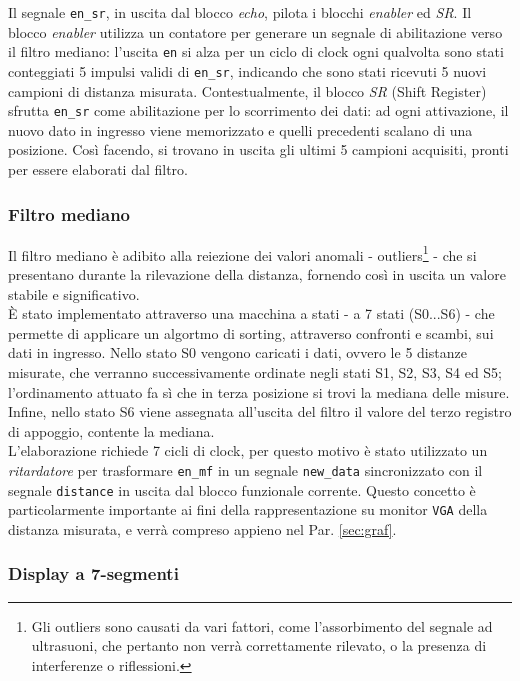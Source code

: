 \documentclass[reprint,amsmath,amssymb,aps,rmp,twoside]{revtex4-2}
\begin{document}
Il segnale \texttt{en\_sr}, in uscita dal blocco \textit{echo}, pilota i blocchi \textit{enabler} ed \textit{SR}. Il blocco \textit{enabler} utilizza un contatore per generare un segnale di abilitazione verso il filtro mediano: l'uscita \texttt{en} si alza per un ciclo di clock ogni qualvolta sono stati conteggiati 5 impulsi validi di \texttt{en\_sr}, indicando che sono stati ricevuti 5 nuovi campioni di distanza misurata. Contestualmente, il blocco \textit{SR} (Shift Register) sfrutta \texttt{en\_sr} come abilitazione per lo scorrimento dei dati: ad ogni attivazione, il nuovo dato in ingresso viene memorizzato e quelli precedenti scalano di una posizione. Così facendo, si trovano in uscita gli ultimi 5 campioni acquisiti, pronti per essere elaborati dal filtro.

\subsubsection{Filtro mediano}

Il filtro mediano è adibito alla reiezione dei valori anomali - outliers\footnote{Gli outliers sono causati da vari fattori, come l'assorbimento del segnale ad ultrasuoni, che pertanto non verrà correttamente rilevato, o la presenza di interferenze o riflessioni.} - che si presentano durante la rilevazione della distanza, fornendo così in uscita un valore stabile e significativo.\\ 
\`E stato implementato attraverso una macchina a stati - a 7 stati (S0...S6) - che permette di applicare un algortmo di sorting, attraverso confronti e scambi, sui dati in ingresso. Nello stato S0 vengono caricati i dati, ovvero le 5 distanze misurate, che verranno successivamente ordinate negli stati S1, S2, S3, S4 ed S5; l'ordinamento attuato fa sì che in terza posizione si trovi la mediana delle misure. Infine, nello stato S6 viene assegnata all'uscita del filtro  il valore del terzo registro di appoggio, contente la mediana.\\
L'elaborazione richiede 7 cicli di clock, per questo motivo è stato utilizzato un \textit{ritardatore} per trasformare \texttt{en\_mf} in un segnale \texttt{new\_data} sincronizzato con il segnale \texttt{distance} in uscita dal blocco funzionale corrente. Questo concetto è particolarmente importante ai fini della rappresentazione su monitor \texttt{VGA} della distanza misurata, e verrà compreso appieno nel Par. \ref{sec:graf}.

\subsubsection{Display a 7-segmenti}
\end{document}
